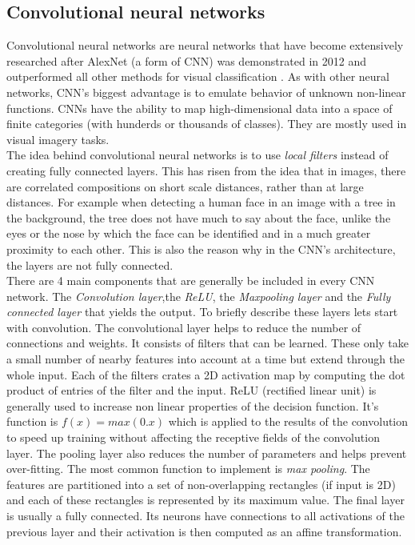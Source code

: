 \subsection{Convolutional neural networks}
Convolutional neural networks are neural networks that have become extensively researched after AlexNet (a form of CNN) was demonstrated in 2012 and outperformed all other methods for visual classification \cite{Krizhevsky:2012:ICD:2999134.2999257}. As with other neural networks, CNN's biggest advantage is to emulate behavior of unknown non-linear functions. CNNs have the ability to map high-dimensional data into a space of finite categories (with hunderds or thousands of classes). They are mostly used in visual imagery tasks. \\
The idea behind convolutional neural networks is to use \textit{local filters} instead of creating fully connected layers. This has risen from the idea that in images, there are correlated compositions on short scale distances, rather than at large distances. For example when detecting a human face in an image with a tree in the background, the tree does not have much to say about the face, unlike the eyes or the nose by which the face can be identified and in a much greater proximity to each other. This is also the reason why in the CNN's architecture, the layers are not fully connected. \\
There are 4 main components that are generally be included in every CNN network. The \textit{Convolution layer},the \textit{ReLU}, the \textit{Maxpooling layer} and the \textit{Fully connected layer} that yields the output. To briefly describe these layers lets start with convolution. The convolutional layer helps to reduce the number of connections and weights. It consists of filters that can be learned. These only take a small number of nearby features into account at a time but extend through the whole input. Each of the filters crates a 2D activation map by computing the dot product of entries of the filter and the input. ReLU (rectified linear unit) is generally used to increase non linear properties of the decision function. It's function is $ f(x) = max(0.x) $ which is applied to the results of the convolution to speed up training without affecting the receptive fields of the convolution layer. The pooling layer also reduces the number of parameters and helps prevent over-fitting. The most common function to implement is \textit{max pooling}. The features are partitioned into a set of non-overlapping rectangles (if input is 2D) and each of these rectangles  is represented by its maximum value. 
The final layer is usually a fully connected. Its neurons have connections to all activations of the previous layer and their activation is then computed as an affine transformation. 

